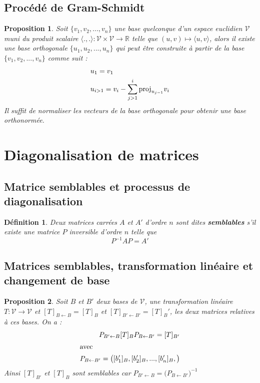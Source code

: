 \documentclass{article}[french, babel]
\newtheorem{mydef}{Définition}
\newtheorem{myprop}{Proposition}
\newcommand{\proj}[2]{\text{\normalfont{proj}}_#1 #2}
\newcommand{\prodsc}[2]{\langle #1,#2\rangle}
\let\stdsection\section
\renewcommand\section{\newpage\stdsection}
\begin{document}
	\subsection{Procédé de Gram-Schmidt}
		\begin{myprop}
			Soit $\{v_1,v_2,...,v_n\}$ une base quelconque d'un espace euclidien $\mathcal{V}$ muni du produit scalaire $\prodsc{.}{.}:\mathcal{V}\times\mathcal{V}\longrightarrow\mathbb{R}$ telle que $(u,v)\mapsto\prodsc{u}{v}$, alors il existe une base orthogonale $\{u_1,u_2,...,u_n\}$ qui peut être construite à partir de la base $\{v_1,v_2,...,v_n\}$ comme suit :
			\begin{align*}
				&u_1 = v_1\\
				&u_{i>1}=v_i-\sum_{j>1}^{i}\proj{{u_{j-1}}}{v_i}
			\end{align*} 
			Il suffit de normaliser les vecteurs de la base orthogonale pour obtenir une base orthonormée. 
		\end{myprop}
\section{Diagonalisation de matrices}
	\subsection{Matrice semblables et processus de diagonalisation}
		\begin{mydef}
			Deux matrices carrées $A$ et $A'$ d'ordre $n$ sont dites \textbf{semblables} s'il existe une matrice $P$ inversible d'ordre $n$ telle que \[P^{-1}A P=A'\]
		\end{mydef}
	\subsection{Matrices semblables, transformation linéaire et changement de base}
		\begin{myprop}
			Soit $B$ et $B'$ deux bases de $\mathcal{V}$, une transformation linéaire $T:\mathcal{V}\longrightarrow\mathcal{V}$ et $[T]_{B\leftarrow B}=[T]_B$ et $[T]_{B'\leftarrow B'}=[T]_B'$, les deux matrices relatives à ces bases. On a :	\begin{align*}
				P_{B'\leftarrow B}[T]_{B}P_{B\leftarrow B'}=[T]_{B'}\\
				\intertext{avec}
				P_{B\leftarrow B'}=\big([b'_1]_B,[b'_2]_B,...,[b'_n]_B, \big)
			\end{align*}
			Ainsi $[T]_{B'}$ et $[T]_B$ sont semblables car $P_{B'\leftarrow B}=\big(P_{B\leftarrow B'}\big)^{-1}$
		\end{myprop}
\end{document}
